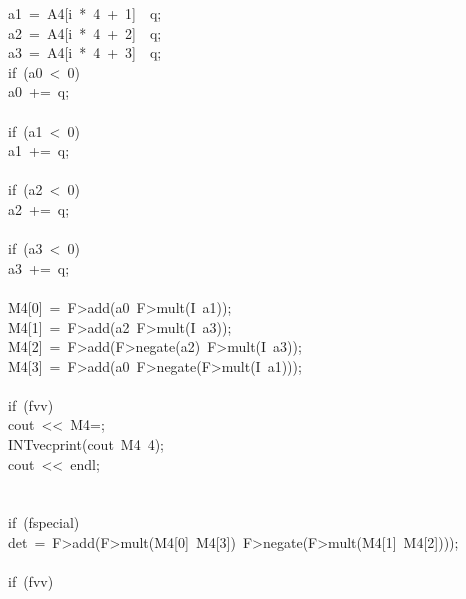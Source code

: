 \begin{tabbing}
\>\>a1\ =\ A4[i\ *\ 4\ +\ 1]\ \ q;\\[0pt]
\>\>a2\ =\ A4[i\ *\ 4\ +\ 2]\ \ q;\\[0pt]
\>\>a3\ =\ A4[i\ *\ 4\ +\ 3]\ \ q;\\[0pt]
\>\>if\ (a0\ <\ 0)\ \\[0pt]
\>\>\>a0\ +=\ q;\\[0pt]
\>\>\>\\[0pt]
\>\>if\ (a1\ <\ 0)\ \\[0pt]
\>\>\>a1\ +=\ q;\\[0pt]
\>\>\>\\[0pt]
\>\>if\ (a2\ <\ 0)\ \\[0pt]
\>\>\>a2\ +=\ q;\\[0pt]
\>\>\>\\[0pt]
\>\>if\ (a3\ <\ 0)\ \\[0pt]
\>\>\>a3\ +=\ q;\\[0pt]
\>\>\>\\[0pt]
\>\>M4[0]\ =\ F>add(a0\ F>mult(I\ a1));\\[0pt]
\>\>M4[1]\ =\ F>add(a2\ F>mult(I\ a3));\\[0pt]
\>\>M4[2]\ =\ F>add(F>negate(a2)\ F>mult(I\ a3));\\[0pt]
\>\>M4[3]\ =\ F>add(a0\ F>negate(F>mult(I\ a1)));\\[0pt]
\\[0pt]
\>\>if\ (fvv)\ \\[0pt]
\>\>\>cout\ <<\ M4=;\\[0pt]
\>\>\>INTvecprint(cout\ M4\ 4);\\[0pt]
\>\>\>cout\ <<\ endl;\\[0pt]
\>\>\>\\[0pt]
\\[0pt]
\>\>if\ (fspecial)\ \\[0pt]
\>\>\>det\ =\ F>add(F>mult(M4[0]\ M4[3])\ F>negate(F>mult(M4[1]\ M4[2])));\\[0pt]
\\[0pt]
\>\>\>if\ (fvv)\ \\[0pt]

\end{tabbing}
